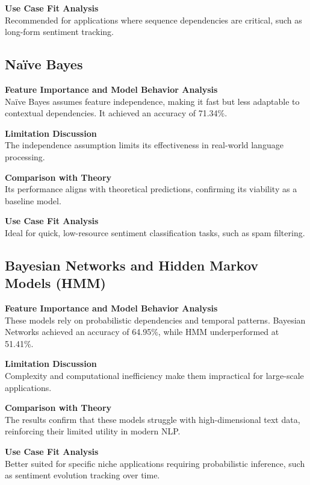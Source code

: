 \textbf{Use Case Fit Analysis} \\
Recommended for applications where sequence dependencies are critical, such as long-form sentiment tracking.

\subsection{Naïve Bayes}

\textbf{Feature Importance and Model Behavior Analysis} \\
Naïve Bayes assumes feature independence, making it fast but less adaptable to contextual dependencies. It achieved an accuracy of 71.34\%.

\textbf{Limitation Discussion} \\
The independence assumption limits its effectiveness in real-world language processing.

\textbf{Comparison with Theory} \\
Its performance aligns with theoretical predictions, confirming its viability as a baseline model.

\textbf{Use Case Fit Analysis} \\
Ideal for quick, low-resource sentiment classification tasks, such as spam filtering.

\subsection{Bayesian Networks and Hidden Markov Models (HMM)}

\textbf{Feature Importance and Model Behavior Analysis} \\
These models rely on probabilistic dependencies and temporal patterns. Bayesian Networks achieved an accuracy of 64.95\%, while HMM underperformed at 51.41\%.

\textbf{Limitation Discussion} \\
Complexity and computational inefficiency make them impractical for large-scale applications.

\textbf{Comparison with Theory} \\
The results confirm that these models struggle with high-dimensional text data, reinforcing their limited utility in modern NLP.

\textbf{Use Case Fit Analysis} \\
Better suited for specific niche applications requiring probabilistic inference, such as sentiment evolution tracking over time.

